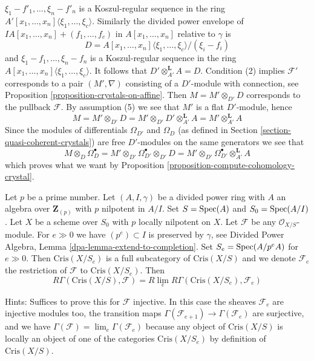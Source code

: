 \begin{remark}
$\xi_1 - f'_1, \ldots, \xi_n - f'_n$ is a Koszul-regular sequence in the
ring $A'[x_1, \ldots, x_n]\langle \xi_1, \ldots, \xi_c\rangle$.
Similarly the divided power envelope of
$IA[x_1, \ldots, x_n] + (f_1, \ldots, f_c)$ in $A[x_1, \ldots, x_n]$
relative to $\gamma$ is
$$
D = A[x_1, \ldots, x_n]\langle \xi_1, \ldots, \xi_c\rangle/(\xi_i - f_i)
$$
and $\xi_1 - f_1, \ldots, \xi_n - f_n$ is a Koszul-regular sequence in the
ring $A[x_1, \ldots, x_n]\langle \xi_1, \ldots, \xi_c\rangle$.
It follows that $D' \otimes_{A'}^\mathbf{L} A = D$. Condition (2)
implies $\mathcal{F}'$ corresponds to a pair $(M', \nabla)$
consisting of a $D'$-module with connection, see
Proposition \ref{proposition-crystals-on-affine}.
Then $M = M' \otimes_{D'} D$ corresponds to the pullback $\mathcal{F}$.
By assumption (5) we see that $M'$ is a flat $D'$-module, hence
$$
M = M' \otimes_{D'} D = M' \otimes_{D'} D' \otimes_{A'}^\mathbf{L} A
= M' \otimes_{A'}^\mathbf{L} A
$$
Since the modules of differentials $\Omega_{D'}$ and $\Omega_D$
(as defined in Section \ref{section-quasi-coherent-crystals})
are free $D'$-modules on the same generators we see that
$$
M \otimes_D \Omega^\bullet_D =
M' \otimes_{D'} \Omega^\bullet_{D'} \otimes_{D'} D =
M' \otimes_{D'} \Omega^\bullet_{D'} \otimes_{A'}^\mathbf{L} A
$$
which proves what we want by
Proposition \ref{proposition-compute-cohomology-crystal}.
\end{remark}

\begin{remark}[Rlim]
\label{remark-rlim}
Let $p$ be a prime number. Let $(A, I, \gamma)$ be a divided power
ring with $A$ an algebra over $\mathbf{Z}_{(p)}$ with $p$ nilpotent
in $A/I$. Set $S = \mathop{\mathrm{Spec}}(A)$ and $S_0 = \mathop{\mathrm{Spec}}(A/I)$.
Let $X$ be a scheme over $S_0$ with $p$ locally
nilpotent on $X$. Let $\mathcal{F}$ be any
$\mathcal{O}_{X/S}$-module. For $e \gg 0$ we have $(p^e) \subset I$
is preserved by $\gamma$, see
Divided Power Algebra, Lemma \ref{dpa-lemma-extend-to-completion}.
Set $S_e = \mathop{\mathrm{Spec}}(A/p^eA)$ for $e \gg 0$.
Then $\text{Cris}(X/S_e)$ is a full subcategory of $\text{Cris}(X/S)$
and we denote $\mathcal{F}_e$ the restriction of $\mathcal{F}$ to
$\text{Cris}(X/S_e)$. Then
$$
R\Gamma(\text{Cris}(X/S), \mathcal{F}) =
R\lim_e R\Gamma(\text{Cris}(X/S_e), \mathcal{F}_e)
$$

\medskip\noindent
Hints: Suffices to prove this for $\mathcal{F}$ injective.
In this case the sheaves $\mathcal{F}_e$ are injective
modules too, the transition maps
$\Gamma(\mathcal{F}_{e + 1}) \to \Gamma(\mathcal{F}_e)$ are
surjective, and we have
$\Gamma(\mathcal{F}) = \lim_e \Gamma(\mathcal{F}_e)$ because
any object of $\text{Cris}(X/S)$ is locally an object of one
of the categories $\text{Cris}(X/S_e)$ by definition of
$\text{Cris}(X/S)$.
\end{remark}

